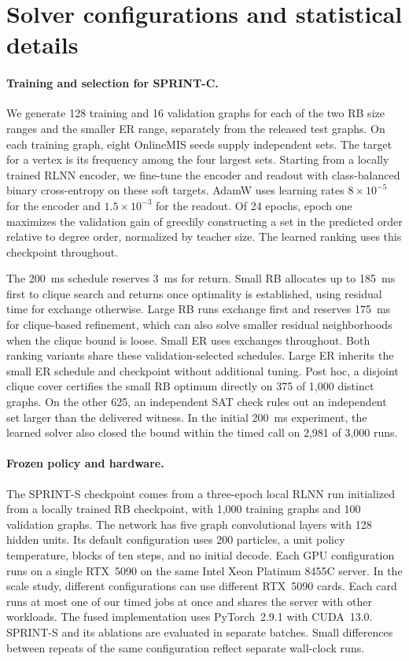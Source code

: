 \section{Solver configurations and statistical details}
\label{app:protocol}

\paragraph{Training and selection for SPRINT-C.}
We generate 128 training and 16 validation graphs for each of the two RB size ranges and the smaller ER range, separately from the released test graphs. On each training graph, eight OnlineMIS seeds supply independent sets. The target for a vertex is its frequency among the four largest sets. Starting from a locally trained RLNN encoder, we fine-tune the encoder and readout with class-balanced binary cross-entropy on these soft targets. AdamW uses learning rates $8{\times}10^{-5}$ for the encoder and $1.5{\times}10^{-3}$ for the readout. Of 24 epochs, epoch one maximizes the validation gain of greedily constructing a set in the predicted order relative to degree order, normalized by teacher size. The learned ranking uses this checkpoint throughout.

The 200~ms schedule reserves 3~ms for return. Small RB allocates up to 185~ms first to clique search and returns once optimality is established, using residual time for exchange otherwise. Large RB runs exchange first and reserves 175~ms for clique-based refinement, which can also solve smaller residual neighborhoods when the clique bound is loose. Small ER uses exchanges throughout. Both ranking variants share these validation-selected schedules. Large ER inherits the small ER schedule and checkpoint without additional tuning. Post hoc, a disjoint clique cover certifies the small RB optimum directly on 375 of 1,000 distinct graphs. On the other 625, an independent SAT check rules out an independent set larger than the delivered witness. In the initial 200~ms experiment, the learned solver also closed the bound within the timed call on 2,981 of 3,000 runs.

\paragraph{Frozen policy and hardware.}
The SPRINT-S checkpoint comes from a three-epoch local RLNN run initialized from a locally trained RB checkpoint, with 1,000 training graphs and 100 validation graphs. The network has five graph convolutional layers with 128 hidden units. Its default configuration uses 200 particles, a unit policy temperature, blocks of ten steps, and no initial decode. Each GPU configuration runs on a single RTX~5090 on the same Intel Xeon Platinum 8455C server. In the scale study, different configurations can use different RTX~5090 cards. Each card runs at most one of our timed jobs at once and shares the server with other workloads. The fused implementation uses PyTorch~2.9.1 with CUDA~13.0. SPRINT-S and its ablations are evaluated in separate batches. Small differences between repeats of the same configuration reflect separate wall-clock runs.

